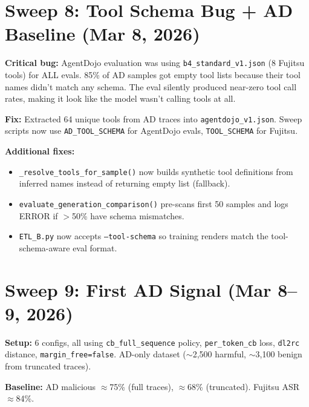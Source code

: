 \documentclass[11pt]{article}
\begin{document}
\section{Sweep 8: Tool Schema Bug + AD Baseline (Mar 8, 2026)}

\textbf{Critical bug:} AgentDojo evaluation was using
\texttt{b4\_standard\_v1.json} (8 Fujitsu tools) for ALL evals. 85\% of AD
samples got empty tool lists because their tool names didn't match any schema.
The eval silently produced near-zero tool call rates, making it look like
the model wasn't calling tools at all.

\textbf{Fix:} Extracted 64 unique tools from AD traces into
\texttt{agentdojo\_v1.json}. Sweep scripts now use \texttt{AD\_TOOL\_SCHEMA}
for AgentDojo evals, \texttt{TOOL\_SCHEMA} for Fujitsu.

\textbf{Additional fixes:}
\begin{itemize}
  \item \texttt{\_resolve\_tools\_for\_sample()} now builds synthetic tool
        definitions from inferred names instead of returning empty list (fallback).
  \item \texttt{evaluate\_generation\_comparison()} pre-scans first 50 samples
        and logs ERROR if $>$50\% have schema mismatches.
  \item \texttt{ETL\_B.py} now accepts \texttt{--tool-schema} so training renders
        match the tool-schema-aware eval format.
\end{itemize}

\section{Sweep 9: First AD Signal (Mar 8--9, 2026)}

\textbf{Setup:} 6 configs, all using \texttt{cb\_full\_sequence} policy,
\texttt{per\_token\_cb} loss, \texttt{dl2rc} distance, \texttt{margin\_free=false}.
AD-only dataset ($\sim$2{,}500 harmful, $\sim$3{,}100 benign from truncated traces).

\textbf{Baseline:} AD malicious $\approx$75\% (full traces), $\approx$68\%
(truncated). Fujitsu ASR $\approx$84\%.
\end{document}
